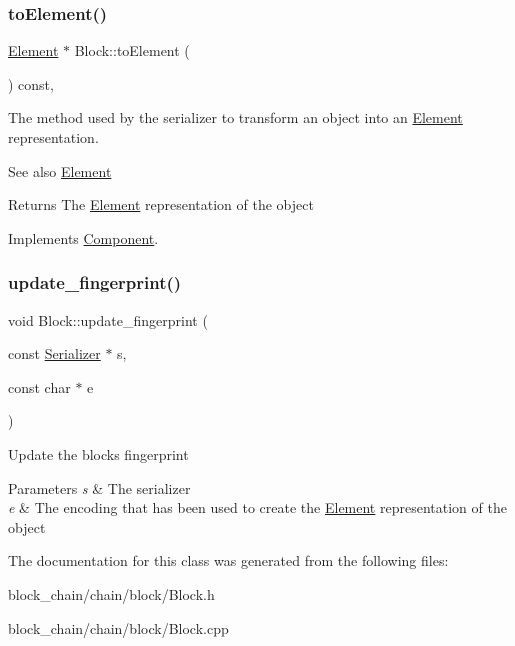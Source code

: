 \subsubsection{\texorpdfstring{to\+Element()}{toElement()}}
{\footnotesize\ttfamily \mbox{\hyperlink{classElement}{Element}} $\ast$ Block\+::to\+Element (\begin{DoxyParamCaption}{ }\end{DoxyParamCaption}) const\hspace{0.3cm}{\ttfamily [override]}, {\ttfamily [virtual]}}

The method used by the serializer to transform an object into an \mbox{\hyperlink{classElement}{Element}} representation. \begin{DoxySeeAlso}{See also}
\mbox{\hyperlink{classElement}{Element}}
\end{DoxySeeAlso}
\begin{DoxyReturn}{Returns}
The \mbox{\hyperlink{classElement}{Element}} representation of the object 
\end{DoxyReturn}


Implements \mbox{\hyperlink{classComponent_a3e63d8c993e417a4af3f56d65ebfc7ea}{Component}}.

\mbox{\label{classBlock_a94171fbe52bfc48542058749f1611228}} 
\subsubsection{\texorpdfstring{update\+\_\+fingerprint()}{update\_fingerprint()}}
{\footnotesize\ttfamily void Block\+::update\+\_\+fingerprint (\begin{DoxyParamCaption}\item[{const \mbox{\hyperlink{classSerializer}{Serializer}} $\ast$}]{s,  }\item[{const char $\ast$}]{e }\end{DoxyParamCaption})}

Update the block\textquotesingle{}s fingerprint


\begin{DoxyParams}{Parameters}
{\em s} & The serializer \\
\hline
{\em e} & The encoding that has been used to create the \mbox{\hyperlink{classElement}{Element}} representation of the object \\
\hline
\end{DoxyParams}


The documentation for this class was generated from the following files\+:\begin{DoxyCompactItemize}
\item 
block\+\_\+chain/chain/block/Block.\+h\item 
block\+\_\+chain/chain/block/Block.\+cpp\end{DoxyCompactItemize}
